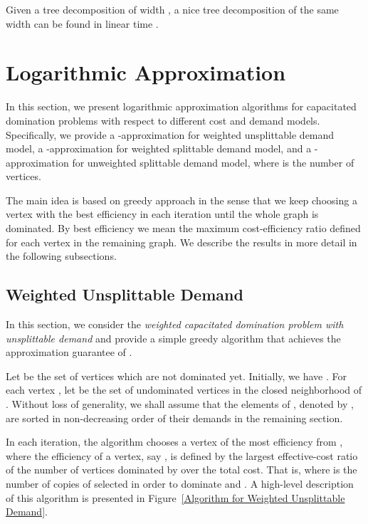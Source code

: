 \documentclass[a4paper,11pt]{article}
\theoremstyle{definition}
\begin{document}
Given a tree decomposition of width , a nice tree decomposition of the same width can be found in linear time \cite{DBLP:books/sp/Kloks94}.



\section{Logarithmic Approximation} \label{logarithmic_approximations}

In this section, we present logarithmic approximation algorithms for
capacitated domination problems with respect to different cost and
demand models. Specifically, we provide a -approximation
for weighted unsplittable demand model, a -approximation for weighted splittable demand model, and a
-approximation for unweighted splittable demand model,
where  is the number of vertices.

The main idea is based on greedy approach in the sense that we keep choosing
a vertex with the best efficiency in each iteration until the whole
graph is dominated.
By best efficiency we mean the maximum cost-efficiency ratio defined for 
each vertex in the remaining graph.
We describe the results in more detail in the following
subsections.

\subsection{Weighted Unsplittable Demand}
\label{section_weighted_unsplittable}

In this section, we consider the {\em weighted capacitated
domination problem with unsplittable demand} and provide a simple
greedy algorithm that achieves the approximation guarantee of .

\smallskip

Let  be the set of vertices which are not dominated yet.
Initially, we have . For each vertex , let
 be the set of undominated vertices in the closed neighborhood of .
Without loss of generality, we shall assume that
the elements of , denoted by , are
sorted in non-decreasing order of their demands in the remaining
section.

\smallskip

In each iteration, the algorithm chooses a vertex of the most efficiency
from , where the efficiency of a vertex, say , is defined by
the largest effective-cost ratio of the number of vertices dominated by  over the total cost. That is, 
 where  is
the number of copies of  selected in order to dominate
 and . A high-level description of this algorithm
is presented in Figure~\ref{Algorithm for Weighted Unsplittable Demand}.
\end{document}
